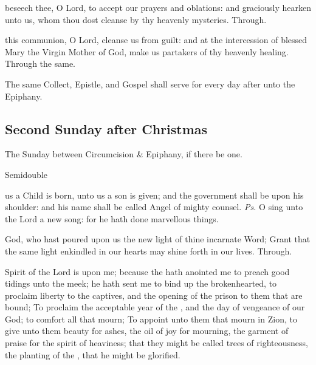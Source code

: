 
\secret
{} beseech thee, O Lord, to accept our prayers and oblations: and graciously hearken unto us, whom thou dost cleanse by thy heavenly mysteries. Through.


\postcommunion
{} this communion, O Lord, cleanse us from guilt: and at the intercession of blessed Mary the Virgin Mother of God, make us partakers of thy heavenly healing. Through the same.

\begin{rubric}
    The same Collect, Epistle, and Gospel shall serve for every day after unto the Epiphany.
\end{rubric}



\clearpage
\subsection{Second Sunday after Christmas}
\fancyhead[RE,LO]{}
\begin{inhead}
{The Sunday between Circumcision \& Epiphany, if there be one.}\par
{Semidouble}
\end{inhead}


\introit
{} us a Child is born, unto us a son is given; and the government shall be upon his shoulder: and his name shall be called Angel of mighty counsel. \textit{Ps.} O sing unto the Lord a new song: for he hath done marvellous things.

\collect
{} God, who hast poured upon us the new light of thine incarnate Word; Grant that the same light enkindled in our hearts may shine forth in our lives. Through.

 Spirit of the Lord  is upon me; because the  hath anointed me to preach good tidings unto the meek; he hath sent me to bind up the brokenhearted, to proclaim liberty to the captives, and the opening of the prison to them that are bound; To proclaim the acceptable year of the , and the day of vengeance of our God; to comfort all that mourn; To appoint unto them that mourn in Zion, to give unto them beauty for ashes, the oil of joy for mourning, the garment of praise for the spirit of heaviness; that they might be called trees of righteousness, the planting of the , that he might be glorified.

